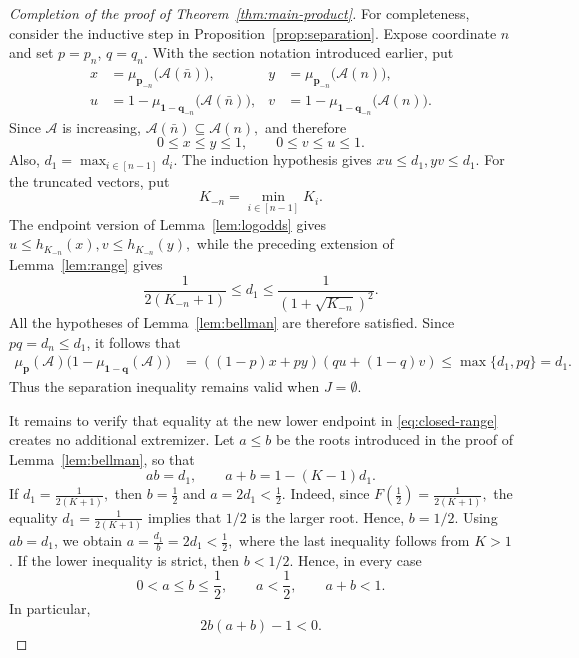 \documentclass[11pt]{article}
\numberwithin{equation}{section}
\theoremstyle{definition}
\theoremstyle{remark}
\begin{document}
\begin{proof}[Completion of the proof of Theorem~\ref{thm:main-product}]
For completeness, consider the inductive step in
Proposition~\ref{prop:separation}.  Expose coordinate $n$ and set
$p=p_n$, $q=q_n$.  With the section notation introduced earlier, put
\begin{align*}
 x&=\mu_{\mathbf p_{-n}}\bigl(\mathcal{A}(\bar n)\bigr),
&
 y&=\mu_{\mathbf p_{-n}}\bigl(\mathcal{A}(n)\bigr),\\
 u&=1-\mu_{\mathbf 1-\mathbf q_{-n}}
       \bigl(\mathcal{A}(\bar n)\bigr),
&
 v&=1-\mu_{\mathbf 1-\mathbf q_{-n}}
       \bigl(\mathcal{A}(n)\bigr).
\end{align*}
Since $\mathcal{A}$ is increasing,
$
 \mathcal{A}(\bar n)\subseteq\mathcal{A}(n),
$
and therefore
\begin{equation*}
 0\leq x\leq y\leq1,
 \qquad
 0\leq v\leq u\leq1.
\end{equation*}
Also,
$
 d_1=\max_{i\in[n-1]}d_i.
$
The induction hypothesis gives
$
 xu\leq d_1,
 yv\leq d_1.
$
For the truncated vectors, put
\begin{equation*}
 K_{-n}=\min_{i\in[n-1]}K_i.
\end{equation*}
The endpoint version of Lemma~\ref{lem:logodds} gives
$
 u\leq h_{K_{-n}}(x),
 v\leq h_{K_{-n}}(y),
$
while the preceding extension of Lemma~\ref{lem:range} gives
\begin{equation*}
 \frac{1}{2(K_{-n}+1)}
 \leq d_1
 \leq
 \frac{1}{(1+\sqrt{K_{-n}})^2}.
\end{equation*}
All the hypotheses of Lemma~\ref{lem:bellman} are therefore satisfied.
Since $pq=d_n\leq d_1$, it follows that
\begin{align*}
 \mu_{\mathbf p}(\mathcal{A})
 \bigl(1-\mu_{\mathbf 1-\mathbf q}(\mathcal{A})\bigr)
 &=
 ((1-p)x+py)(qu+(1-q)v)\leq\max\{d_1,pq\}
 =d_1.
\end{align*}
Thus the separation inequality remains valid when $J=\emptyset$.

It remains to verify that equality at the new lower endpoint in
\eqref{eq:closed-range} creates no additional extremizer.  Let $a\leq b$
be the roots introduced in the proof of
Lemma~\ref{lem:bellman}, so that
\begin{equation*}
 ab=d_1,
 \qquad
 a+b=1-(K-1)d_1.
\end{equation*}
If
$
 d_1=\frac{1}{2(K+1)},
$
then
$
 b=\frac12
$ and
$
 a=2d_1<\frac12.
$
Indeed, since $
 F\left(\frac12\right)
 =
 \frac{1}{2(K+1)},
$
the equality $ d_1=\frac{1}{2(K+1)}$ implies that $1/2$ is the larger
root. Hence, $b=1/2$. Using $ab=d_1$, we  obtain
$
 a=\frac{d_1}{b}=2d_1<\frac12,
$
where the last inequality follows from $K>1$.
 If the lower
inequality is strict, then $b<1/2$.  Hence, in every case
\begin{equation*}
 0<a\leq b\leq\frac12,
 \qquad
 a<\frac12,
 \qquad
 a+b<1.
\end{equation*}
In particular,
\begin{equation}
 2b(a+b)-1<0.
 \label{eq:boundary-sign}
\end{equation}


\end{proof}
\end{document}
